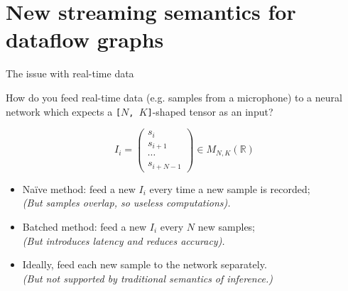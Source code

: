\documentclass{beamer}
\begin{document}
\section{New streaming semantics for dataflow graphs}

\begin{frame}{The issue with real-time data}
    \small
    
    \begin{block}{}
        How do you feed real-time data (e.g. samples from a microphone) to a neural network which expects a \texttt{[$N$, $K$]}-shaped tensor as an input?
    \end{block}
    
    $$I_i =
    \begin{pmatrix}
        s_i \\
        s_{i + 1} \\
        \cdots \\
        s_{i + N - 1}
    \end{pmatrix} \in M_{N, K}(\mathbb{R})
    $$
    
    \begin{itemize}
        \item Naïve method: feed a new $I_i$ every time a new sample is recorded;\\ \textit{(But samples overlap, so useless computations).}
        \item Batched method: feed a new $I_i$ every $N$ new samples; \\ \textit{(But introduces latency and reduces accuracy).}
        \item Ideally, feed each new sample to the network separately. \\ \textit{(But not supported by traditional semantics of inference.)}
    \end{itemize}
\end{frame}
\end{document}
